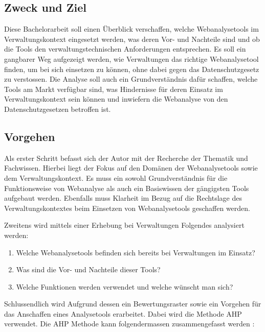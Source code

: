 \subsection{Zweck und Ziel}
Diese Bachelorarbeit soll einen Überblick verschaffen, welche Webanalysetools im Verwaltungskontext eingesetzt werden, was deren Vor- und Nachteile sind und ob die Tools den verwaltungstechnischen Anforderungen entsprechen. Es soll ein gangbarer Weg aufgezeigt werden, wie Verwaltungen das richtige Webanalysetool finden, um bei sich einsetzen zu können, ohne dabei gegen das Datenschutzgesetz zu verstossen. Die Analyse soll auch ein Grundverständnis dafür schaffen, welche Tools am Markt verfügbar sind, was Hindernisse für deren Einsatz im Verwaltungskontext sein können und inwiefern die Webanalyse von den Datenschutzgesetzen betroffen ist.


\subsection{Vorgehen}

Als erster Schritt befasst sich der Autor mit der Recherche der Thematik und Fachwissen. Hierbei liegt der Fokus auf den Domänen der Webanalysetools sowie dem Verwaltungskontext. Es muss ein sowohl Grundverständnis für die Funktionsweise von Webanalyse als auch ein Basiswissen der gängigsten Tools aufgebaut werden. Ebenfalls muss Klarheit im Bezug auf die Rechtslage des Verwaltungskontextes beim Einsetzen von Webanalysetools geschaffen werden. 

Zweitens wird mittels einer Erhebung bei Verwaltungen Folgendes analysiert werden:

\begin{enumerate}
    \item Welche Webanalysetools befinden sich bereits bei Verwaltungen im Einsatz?
    \item Was sind die Vor- und Nachteile dieser Tools?
    \item Welche Funktionen werden verwendet und welche wünscht man sich?
\end{enumerate}

Schlussendlich wird Aufgrund dessen ein Bewertungsraster sowie ein Vorgehen für das Anschaffen eines Analysetools erarbeitet. Dabei wird die Methode AHP verwendet. 
Die AHP Methode kann folgendermassen zusammengefasst werden \parencite[S. 176]{nakatani2011toolselectionmethod}:

